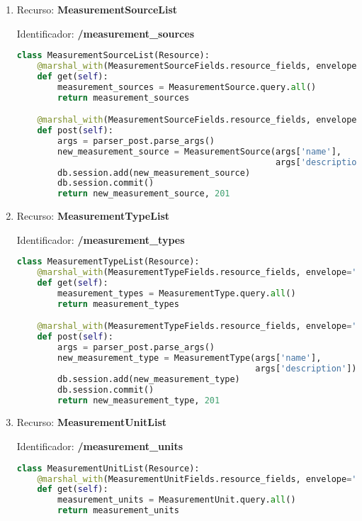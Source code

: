 \begin{enumerate}
\item 	Recurso: \textbf{MeasurementSourceList}

Identificador: \textbf{/measurement\_sources}

\begin{lstlisting}[language=Python]
class MeasurementSourceList(Resource):
    @marshal_with(MeasurementSourceFields.resource_fields, envelope='resource')
    def get(self):
        measurement_sources = MeasurementSource.query.all()
        return measurement_sources

    @marshal_with(MeasurementSourceFields.resource_fields, envelope='resource')
    def post(self):
        args = parser_post.parse_args()
        new_measurement_source = MeasurementSource(args['name'],
                                                   args['description'])
        db.session.add(new_measurement_source)
        db.session.commit()
        return new_measurement_source, 201
\end{lstlisting}

\item Recurso: \textbf{MeasurementTypeList}

Identificador: \textbf{/measurement\_types}

\begin{lstlisting}[language=Python]
class MeasurementTypeList(Resource):
    @marshal_with(MeasurementTypeFields.resource_fields, envelope='resource')
    def get(self):
        measurement_types = MeasurementType.query.all()
        return measurement_types

    @marshal_with(MeasurementTypeFields.resource_fields, envelope='resource')
    def post(self):
        args = parser_post.parse_args()
        new_measurement_type = MeasurementType(args['name'],
                                               args['description'])
        db.session.add(new_measurement_type)
        db.session.commit()
        return new_measurement_type, 201
\end{lstlisting}

\item Recurso: \textbf{MeasurementUnitList}

Identificador: \textbf{/measurement\_units}

\begin{lstlisting}[language=Python]
class MeasurementUnitList(Resource):
    @marshal_with(MeasurementUnitFields.resource_fields, envelope='resource')
    def get(self):
        measurement_units = MeasurementUnit.query.all()
        return measurement_units


\end{lstlisting}
\end{enumerate}
